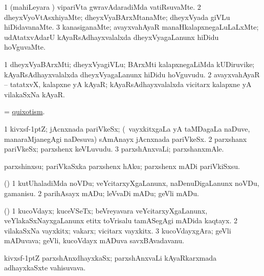 \bentry
{}
\gl{\kirxvi}
\bmng
\bnum
\num{1} (mahiLeyara \vi) vipariVta gwravAdaradiMda vatiRsuvaMte. 
\num{2} dheyxVyoVtAsxhiyaMte; dheyxVyaBArxMtanaMte; dheyxVyada giVLu hiDidavanaMte. 
\num{3} kanasiganaMte; avayxvahAyaR manaHkalapxnegaLuLaLxMte; udAtatxvAdarU kAyaRsAdhayxvalalxda dheyxVyagaLanunx hiDidu hoVguvaMte. 
\enum
\emng
\eentry

\bentry
{}
\gl{\nA}
\bmng
\bnum
\num{1} dheyxVyaBArxMti; dheyxVyagiVLu; BArxMti kalapxnegaLiMda kUDiruvike; kAyaRsAdhayxvalalxda dheyxVyagaLanunx hiDidu hoVguvudu. 
\num{2} avayxvahAyaR -- tatatxvX, kalapxne yA kAyaR; kAyaRsAdhayxvalalxda vicitarx kalapxne yA vilakaSxNa kAyaR. 
\enum
\emng
\eentry

\bentry
{}
\gl{\nA}
\bmng
= \hyperlink{quixotism}{quixotism}. 
\emng
\eentry

\bentry
{}
\gl{\nA}
\bmng
\bnum
\num{1} kivxsf\kern -1ptZ; jAcnxnada pariVkeSx; (\kanmu\ vayxkitxgaLa yA taMDagaLa naDuve, manaraMjanegAgi naDesuva) sAmAnayx jAcnxnada pariVkeSx. 
\num{2} parxshanx pariVkeSx; parxshenx keVLuvudu. 
\num{3} parxshAnxvaLi; parxshanxmAle. 
\enum
\emng
\eentry

\bentry
{}
\gl{\sakirx}
\bmng
parxshinxsu; pariVkaSxka parxshenx hAku; parxshenx mADi pariVkiSxsu. 
\emng
\eentry

\bentry
{}
\gl{\sakirx}
\bmng
(\pArxparx) 
\bnum
\num{1} kutUhaladiMda noVDu; veYcitarxyXgaLanunx, naDenuDigaLanunx noVDu, gamanisu. 
\num{2} parihAsayx mADu; leVvaDi mADu; geVli mADu. 
\enum
\emng
\eentry

\bentry
{}
\gl{\nA}
\bmng
(\pArxparx) 
\bnum
\num{1} kucoVdayx; kuceVSeTx; beVreyavara veYcitarxyXgaLanunx, veYlakaSxNayxgaLanunx etitx toVrisalu tamASegAgi mADida kaqtayx. 
\num{2} vilakaSxNa vayxkitx; vakarx; vicitarx vayxkitx. 
\num{3} kucoVdayxgAra; geVli mADuvava; geVli, kucoVdayx mADuva savxBAvadavanu. 
\enum
\emng
\eentry

\bentry
{}
\gl{\nA}
\bmng
kivxsf\kern -1ptZ parxshAnxdhayxkaSx; parxshAnxvaLi kAyaRkarxmada adhayxkaSxte vahisuvava. 
\emng
\eentry

